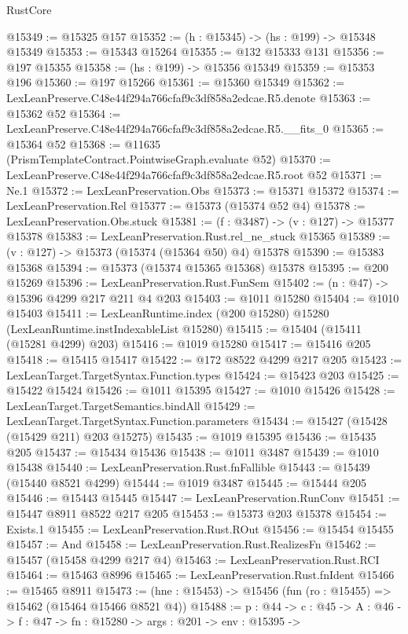 \begin{lexlean}{RustCore}
\begin{coremodule}
@15349 := @15325 @157
@15352 := (h : @15345) -> (hs : @199) -> @15348 @15349
@15353 := @15343 @15264
@15355 := @132 @15333 @131
@15356 := @197 @15355
@15358 := (hs : @199) -> @15356 @15349
@15359 := @15353 @196
@15360 := @197 @15266
@15361 := @15360 @15349
@15362 := LexLeanPreserve.C48e44f294a766cfaf9c3df858a2edcae.R5.denote
@15363 := @15362 @52
@15364 := LexLeanPreserve.C48e44f294a766cfaf9c3df858a2edcae.R5.__fits_0
@15365 := @15364 @52
@15368 := @11635 (PrismTemplateContract.PointwiseGraph.evaluate @52)
@15370 := LexLeanPreserve.C48e44f294a766cfaf9c3df858a2edcae.R5.root @52
@15371 := Ne.{1}
@15372 := LexLeanPreservation.Obs
@15373 := @15371 @15372
@15374 := LexLeanPreservation.Rel
@15377 := @15373 (@15374 @52 @4)
@15378 := LexLeanPreservation.Obs.stuck
@15381 := (f : @3487) -> (v : @127) -> @15377 @15378
@15383 := LexLeanPreservation.Rust.rel_ne_stuck @15365
@15389 := (v : @127) -> @15373 (@15374 (@15364 @50) @4) @15378
@15390 := @15383 @15368
@15394 := @15373 (@15374 @15365 @15368) @15378
@15395 := @200 @15269
@15396 := LexLeanPreservation.Rust.FunSem
@15402 := (n : @47) -> @15396 @4299 @217 @211 @4 @203
@15403 := @1011 @15280
@15404 := @1010 @15403
@15411 := LexLeanRuntime.index (@200 @15280) @15280 (LexLeanRuntime.instIndexableList @15280)
@15415 := @15404 (@15411 (@15281 @4299) @203)
@15416 := @1019 @15280
@15417 := @15416 @205
@15418 := @15415 @15417
@15422 := @172 @8522 @4299 @217 @205
@15423 := LexLeanTarget.TargetSyntax.Function.types
@15424 := @15423 @203
@15425 := @15422 @15424
@15426 := @1011 @15395
@15427 := @1010 @15426
@15428 := LexLeanTarget.TargetSemantics.bindAll
@15429 := LexLeanTarget.TargetSyntax.Function.parameters
@15434 := @15427 (@15428 (@15429 @211) @203 @15275)
@15435 := @1019 @15395
@15436 := @15435 @205
@15437 := @15434 @15436
@15438 := @1011 @3487
@15439 := @1010 @15438
@15440 := LexLeanPreservation.Rust.fnFallible
@15443 := @15439 (@15440 @8521 @4299)
@15444 := @1019 @3487
@15445 := @15444 @205
@15446 := @15443 @15445
@15447 := LexLeanPreservation.RunConv
@15451 := @15447 @8911 @8522 @217 @205
@15453 := @15373 @203 @15378
@15454 := Exists.{1}
@15455 := LexLeanPreservation.Rust.ROut
@15456 := @15454 @15455
@15457 := And
@15458 := LexLeanPreservation.Rust.RealizesFn
@15462 := @15457 (@15458 @4299 @217 @4)
@15463 := LexLeanPreservation.Rust.RCI
@15464 := @15463 @8996
@15465 := LexLeanPreservation.Rust.fnIdent
@15466 := @15465 @8911
@15473 := (hne : @15453) -> @15456 (fun (ro : @15455) => @15462 (@15464 @15466 @8521 @4))
@15488 := {p : @44} ->
  {c : @45} ->
  {A : @46} ->
  {f : @47} ->
  {fn : @15280} ->
  {args : @201} ->
  {env : @15395} ->

\end{coremodule}
\end{lexlean}
